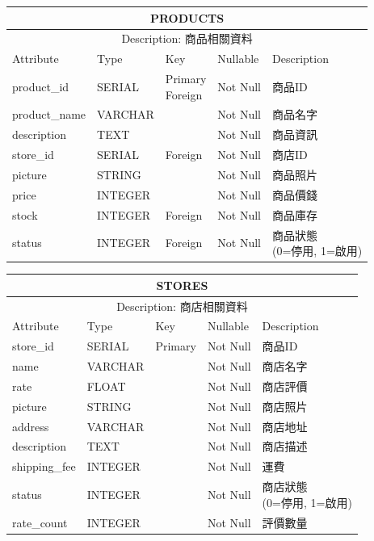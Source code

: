 \documentclass[a4paper, 12pt]{article}
\begin{document}
\noindent\begin{tabular}{ | p{7em} | p{5.5em} | p{5.5em} | p{4.5em} | p{11em} |}
  \hline
  \multicolumn{5}{|c|}{PRODUCTS} \tabularnewline
  \hline 
  \multicolumn{5}{|c|}{Description: 商品相關資料} \tabularnewline
  \hline 
  Attribute & Type & Key & Nullable & Description \\
  \hline
  product_id& SERIAL & \makecell[l]{Primary \\ Foreign}  & Not Null & 商品ID \\
  \hline
  product_name & VARCHAR & &Not Null &商品名字\\
  \hline
  description & TEXT & &Not Null &商品資訊\\
  \hline
  store_id & SERIAL &Foreign &Not Null &商店ID\\
  \hline
  picture & STRING & &Not Null &商品照片\\
  \hline
  price & INTEGER & &Not Null &商品價錢\\
  \hline
  stock & INTEGER & Foreign &Not Null &商品庫存\\
  \hline
  status & INTEGER & Foreign &Not Null &\makecell[l]{商品狀態\\(0=停用, 1=啟用)}\\
  \hline
\end{tabular}

\noindent\begin{tabular}{ | p{7em} | p{5.5em} | p{5.5em} | p{4.5em} | p{11em} |}
  \hline
  \multicolumn{5}{|c|}{STORES} \tabularnewline
  \hline 
  \multicolumn{5}{|c|}{Description: 商店相關資料} \tabularnewline
  \hline 
  Attribute & Type & Key & Nullable & Description \\
  \hline
  store_id& SERIAL & Primary & Not Null & 商品ID \\
  \hline
  name & VARCHAR & &Not Null &商店名字\\
  \hline
  rate & FLOAT & &Not Null &商店評價\\
  \hline
  picture & STRING & &Not Null &商店照片\\
  \hline
  address & VARCHAR & &Not Null &商店地址\\
  \hline
  description & TEXT & &Not Null &商店描述\\
  \hline
  shipping_fee & INTEGER & &Not Null &運費\\
  \hline
  status & INTEGER & &Not Null &\makecell[l]{商店狀態\\(0=停用, 1=啟用)}\\
  \hline
  rate_count & INTEGER & &Not Null &評價數量\\
  \hline
\end{tabular}
\vspace{1em}
\end{document}
